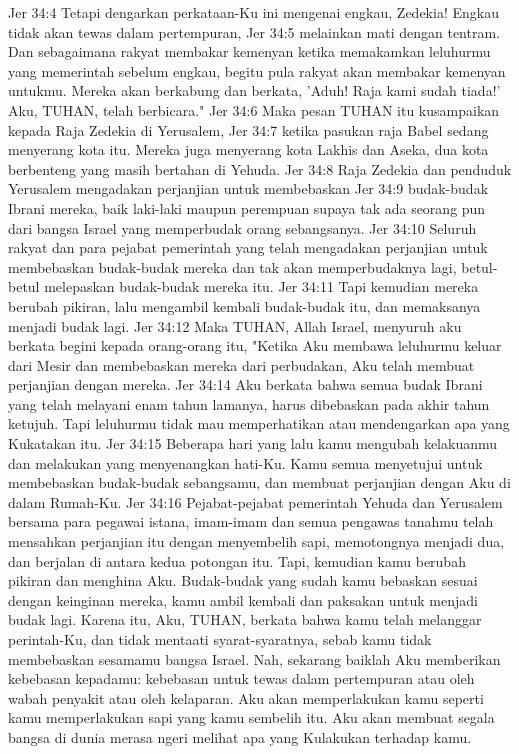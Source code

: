 Jer 34:4  Tetapi dengarkan perkataan-Ku ini mengenai engkau, Zedekia! Engkau tidak akan tewas dalam pertempuran,
Jer 34:5  melainkan mati dengan tentram. Dan sebagaimana rakyat membakar kemenyan ketika memakamkan leluhurmu yang memerintah sebelum engkau, begitu pula rakyat akan membakar kemenyan untukmu. Mereka akan berkabung dan berkata, 'Aduh! Raja kami sudah tiada!' Aku, TUHAN, telah berbicara."
Jer 34:6  Maka pesan TUHAN itu kusampaikan kepada Raja Zedekia di Yerusalem,
Jer 34:7  ketika pasukan raja Babel sedang menyerang kota itu. Mereka juga menyerang kota Lakhis dan Aseka, dua kota berbenteng yang masih bertahan di Yehuda.
Jer 34:8  Raja Zedekia dan penduduk Yerusalem mengadakan perjanjian untuk membebaskan
Jer 34:9  budak-budak Ibrani mereka, baik laki-laki maupun perempuan supaya tak ada seorang pun dari bangsa Israel yang memperbudak orang sebangsanya.
Jer 34:10  Seluruh rakyat dan para pejabat pemerintah yang telah mengadakan perjanjian untuk membebaskan budak-budak mereka dan tak akan memperbudaknya lagi, betul-betul melepaskan budak-budak mereka itu.
Jer 34:11  Tapi kemudian mereka berubah pikiran, lalu mengambil kembali budak-budak itu, dan memaksanya menjadi budak lagi.
Jer 34:12  Maka TUHAN, Allah Israel, menyuruh aku berkata begini kepada orang-orang itu, "Ketika Aku membawa leluhurmu keluar dari Mesir dan membebaskan mereka dari perbudakan, Aku telah membuat perjanjian dengan mereka.
Jer 34:14  Aku berkata bahwa semua budak Ibrani yang telah melayani enam tahun lamanya, harus dibebaskan pada akhir tahun ketujuh. Tapi leluhurmu tidak mau memperhatikan atau mendengarkan apa yang Kukatakan itu.
Jer 34:15  Beberapa hari yang lalu kamu mengubah kelakuanmu dan melakukan yang menyenangkan hati-Ku. Kamu semua menyetujui untuk membebaskan budak-budak sebangsamu, dan membuat perjanjian dengan Aku di dalam Rumah-Ku.
Jer 34:16  Pejabat-pejabat pemerintah Yehuda dan Yerusalem bersama para pegawai istana, imam-imam dan semua pengawas tanahmu telah mensahkan perjanjian itu dengan menyembelih sapi, memotongnya menjadi dua, dan berjalan di antara kedua potongan itu. Tapi, kemudian kamu berubah pikiran dan menghina Aku. Budak-budak yang sudah kamu bebaskan sesuai dengan keinginan mereka, kamu ambil kembali dan paksakan untuk menjadi budak lagi. Karena itu, Aku, TUHAN, berkata bahwa kamu telah melanggar perintah-Ku, dan tidak mentaati syarat-syaratnya, sebab kamu tidak membebaskan sesamamu bangsa Israel. Nah, sekarang baiklah Aku memberikan kebebasan kepadamu: kebebasan untuk tewas dalam pertempuran atau oleh wabah penyakit atau oleh kelaparan. Aku akan memperlakukan kamu seperti kamu memperlakukan sapi yang kamu sembelih itu. Aku akan membuat segala bangsa di dunia merasa ngeri melihat apa yang Kulakukan terhadap kamu.
